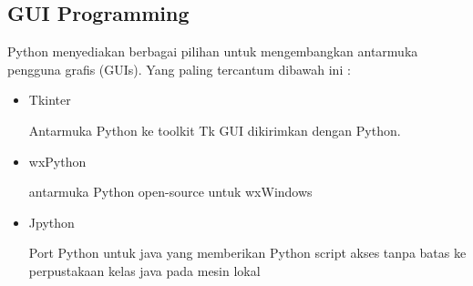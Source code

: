 \documentclass{wileySix}
\begin{document}
\begin{myEnumerate}
{\chapter{GUI Programming}
\par
\vspace{12pt}
Python menyediakan berbagai pilihan untuk mengembangkan antarmuka pengguna grafis (GUIs). Yang paling tercantum dibawah ini : \par
\noindent 
\begin{itemize}
	\item Tkinter \par
	Antarmuka Python ke toolkit Tk GUI dikirimkan dengan Python.  \par
	\noindent 
	\item wxPython \par
	antarmuka Python open-source untuk wxWindows \par
	\noindent 
	\item Jpython \par
	Port Python untuk java yang memberikan Python script akses tanpa batas ke perpustakaan kelas java pada mesin lokal \par
	\vspace{12pt}
	\noindent 
	

\end{itemize}}
\end{myEnumerate}
\end{document}
